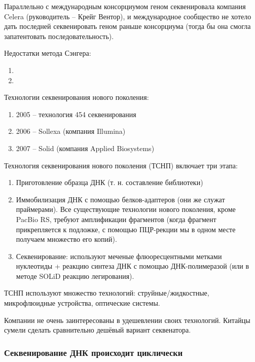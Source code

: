 \documentclass[main.tex]{subfiles}
\begin{document}
Параллельно с международным консорциумом геном секвенировала компания Celera (руководитель -- Крейг Вентор), и международное сообщество не хотело дать последней секвенировать геном раньше консорциума (тогда бы она смогла запатентовать последовательность).

Недостатки метода Сэнгера:

\begin{enumerate}[noitemsep]
    \item %
    \item
\end{enumerate}

Технологии секвенирования нового поколения:
\begin{enumerate}[noitemsep]
    \item 2005 -- технология 454 секвенирования
    \item 2006 -- Sollexa (компания Illumina)
    \item 2007 -- Solid (компания Applied Biosystems)
\end{enumerate}

Технология секвенирования нового поколения (ТСНП) включает три этапа:
\begin{enumerate}[noitemsep]
    \item Приготовление образца ДНК (т. н. составление библиотеки)
    \item Иммобилизация ДНК с помощью белков-адаптеров (они же служат праймерами).
    Все существующие технологии нового поколения, кроме PacBio RS, требуют амплификации фрагментов (когда фрагмент прикрепляется к подложке, с помощью ПЦР-рекции мы в одном месте получаем множество его копий).
    \item Секвенирование: используют меченые флюоресцентными метками нуклеотиды + реакцию синтеза ДНК с помощью ДНК-полимеразой (или в методе  SOLiD реакцию легирования).
\end{enumerate}

ТСНП используют множество технологий: струйные/жидкостные, микрофлюидные устройства, оптические системы.

Компании не очень заинтересованы в удешевлении своих технологий.
Китайцы сумели сделать сравнительно дешёвый вариант секвенатора.

\subsubsection{Секвенирование ДНК происходит циклически}
\end{document}
